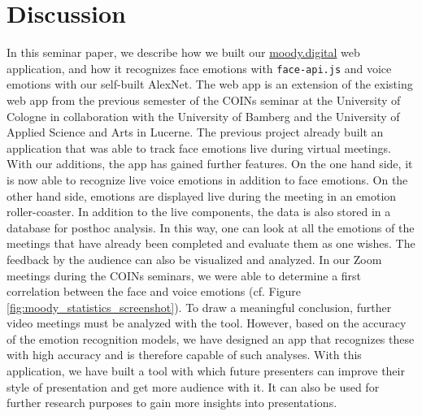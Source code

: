 \section{Discussion}
\label{sec:Discussion}
In this seminar paper, we describe how we built our \url{moody.digital} web application, and how it recognizes face emotions with \texttt{face-api.js} and voice emotions with our self-built AlexNet. The web app is an extension of the existing web app from the previous semester of the COINs seminar at the University of Cologne in collaboration with the University of Bamberg and the University of Applied Science and Arts in Lucerne. The previous project already built an application that was able to track face emotions live during virtual meetings. With our additions, the app has gained further features. On the one hand side, it is now able to recognize live voice emotions in addition to face emotions. On the other hand side, emotions are displayed live during the meeting in an emotion roller-coaster. In addition to the live components, the data is also stored in a database for posthoc analysis. In this way, one can look at all the emotions of the meetings that have already been completed and evaluate them as one wishes. The feedback by the audience can also be visualized and analyzed. In our Zoom meetings during the COINs seminars, we were able to determine a first correlation between the face and voice emotions (cf. Figure \ref{fig:moody_statistics_screenshot}). To draw a meaningful conclusion, further video meetings must be analyzed with the tool. However, based on the accuracy of the emotion recognition models, we have designed an app that recognizes these with high accuracy and is therefore capable of such analyses. 
With this application, we have built a tool with which future presenters can improve their style of presentation and get more audience with it. It can also be used for further research purposes to gain more insights into presentations.
